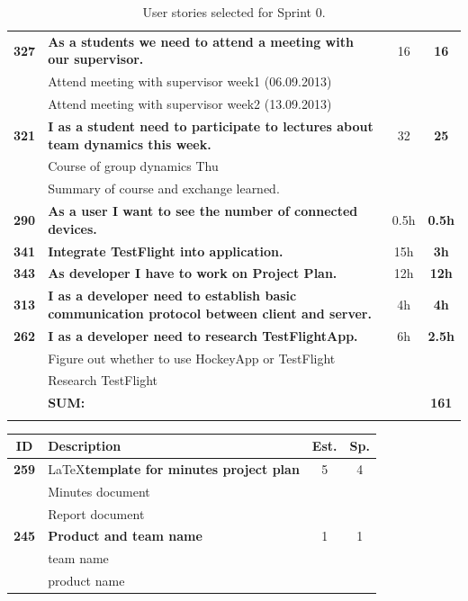 \begin{longtable}{cp{8cm}cc}
\textbf{327} 	& {\bf As a students we need to attend a meeting with our supervisor. } 	& 		16	& \textbf{16} \\
				& Attend meeting with supervisor week1 (06.09.2013)	&  &  \\
				& Attend meeting with supervisor week2 (13.09.2013)	&  &  \\

\textbf{321} 	& {\bf I as a student need to participate to lectures about team dynamics this week. } 	& 		32	& \textbf{25} \\
				& Course of group dynamics Thu	&  &  \\
				& Summary of course and exchange learned.	&  &  \\
				
\textbf{290} 	& {\bf As a user I want to see the number of connected devices. } 	& 		0.5h	& \textbf{0.5h} \\

\textbf{341} 	& {\bf Integrate TestFlight into application. } 	& 		15h	& \textbf{3h} \\

\textbf{343} 	& {\bf As developer I have to work on Project Plan.} 	& 		12h	& \textbf{12h} \\

\textbf{313} 	& {\bf I as a developer need to establish basic communication protocol between client and server.} 	& 		4h	& \textbf{4h} \\

\textbf{262} 	& {\bf I as a developer need to research TestFlightApp. } 	& 		6h	& \textbf{2.5h} \\
				& Figure out whether to use HockeyApp or TestFlight&  &  \\
				& Research TestFlight	&  &  \\
				
\hline
				& \textbf{SUM:}		&			& \textbf{161}
 \\																			
\bottomrule[1mm]
\caption{User stories selected for Sprint 0. }
\label{tab:sprint0stories}
\end{longtable}

\begin{longtable}{cp{8cm}cc}
\toprule
\textbf{ID} 	& \textbf{Description} 									& \textbf{Est.} & \textbf{Sp.} \\
\hline
\textbf{259} 	& \LaTeX \textbf{template for minutes project plan} 	& 5 			& 4 \\
				& Minutes document \\
				& Report document \\
\hline						
\textbf{245} 	& \textbf{Product and team name} 						& 1 			& 1 \\
				& team name \\
				& product name \\
\bottomrule
\end{longtable}

